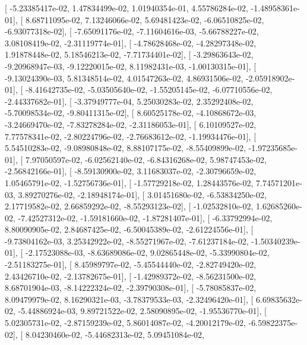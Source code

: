 \documentclass{article}
\begin{document}
       [ -5.23385417e-02,   1.47834499e-02,   1.01940354e-01,
          4.55786284e-02,  -1.48958361e-01],
       [  8.68711095e-02,   7.13246066e-02,   5.69481423e-02,
         -6.06510825e-02,  -6.93077318e-02],
       [ -7.65091176e-02,  -7.11604616e-03,  -5.66788227e-02,
          3.08108419e-02,  -2.31119774e-01],
       [ -4.78628468e-02,  -4.28297348e-02,   1.91878448e-02,
          5.18546213e-02,  -7.71734401e-02],
       [ -3.29863643e-02,  -9.20968947e-03,  -9.12220015e-02,
          8.11982431e-03,  -1.00130315e-01],
       [ -9.13024390e-03,   5.81348514e-02,   4.01547263e-02,
          4.86931506e-02,  -2.05918902e-01],
       [ -8.41642735e-02,  -5.03505640e-02,  -1.55205145e-02,
         -6.07710556e-02,  -2.44337682e-01],
       [ -3.37949777e-04,   5.25030283e-02,   2.35292408e-02,
         -5.70098534e-02,  -9.80411315e-02],
       [  8.60525178e-02,  -4.10868672e-03,  -3.24669470e-02,
         -7.83278284e-02,  -2.31186053e-01],
       [  6.10109527e-02,   7.77578341e-02,  -2.80224796e-02,
         -2.76683612e-02,  -1.19934476e-01],
       [  5.54510283e-02,  -9.08980848e-02,   8.88107175e-02,
         -8.55409899e-02,  -1.97235685e-01],
       [  7.97050597e-02,  -6.02562140e-02,  -6.84316268e-02,
          5.98747453e-02,  -2.56842166e-01],
       [ -8.59130900e-02,   3.11683037e-02,  -2.30796659e-02,
          1.05465791e-02,  -1.52756736e-01],
       [ -1.57729218e-02,   1.28443576e-02,   7.74571201e-03,
          3.89270276e-02,  -2.18948174e-01],
       [  3.01451680e-02,  -6.53834250e-02,   2.17719582e-02,
          2.66859292e-02,  -8.55293123e-02],
       [ -1.02532810e-02,   1.62685260e-02,  -7.42527312e-02,
         -1.59181660e-02,  -1.87281407e-01],
       [ -6.33792994e-02,   8.80090905e-02,   2.84687425e-02,
         -6.50045389e-02,  -2.61224556e-01],
       [ -9.73804162e-03,   3.25342922e-02,  -8.55271967e-02,
         -7.61237184e-02,  -1.50340239e-01],
       [ -2.17523088e-03,  -8.63689086e-02,   9.02865448e-02,
         -5.33990804e-02,  -2.51183275e-01],
       [  8.45989797e-02,  -5.45544440e-02,  -2.82749420e-02,
          2.43426710e-02,  -2.13782675e-01],
       [ -1.42989372e-02,  -8.56231500e-02,   8.68701904e-03,
         -8.14222324e-02,  -2.39790308e-01],
       [ -5.78085837e-02,   8.09479979e-02,   8.16290321e-03,
         -3.78379533e-03,  -2.32496420e-01],
       [  6.69835632e-02,  -5.44886924e-03,   9.89721522e-02,
          2.58090895e-02,  -1.95536770e-01],
       [  5.02305731e-02,  -2.87159239e-02,   5.86014087e-02,
         -4.20012179e-02,  -6.59822375e-02],
       [  8.04230460e-02,  -5.44682313e-02,   5.09451084e-02,
\end{document}
